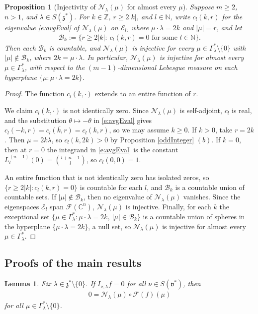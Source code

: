 \documentclass[11pt]{amsart}
\theoremstyle{plain}
\newtheorem{lemma}[theorem]{Lemma}
\newtheorem{proposition}[theorem]{Proposition}
\theoremstyle{definition}
\theoremstyle{remark}
\numberwithin{equation}{section}
\def\fz{\mathfrak{z}}
\def\fv{\mathfrak{v}}
\def\cB{\mathcal{B}}
\def\cE{\mathcal{E}}
\def\cN{\mathcal{N}}
\def\cF{\mathcal{F}}
\def\mz{\setminus\{0\}}
\def\C{{\mathbb C}}%
\def\N{{\mathbb N}}%
\def\Z{{\mathbb Z}}%
\numberwithin{equation}{section}
\begin{document}
\begin{proposition}[Injectivity of $\cN_\lambda(\mu)$ for almost every $\mu$]\label{p:aeInj}
	Suppose $m\geq 2$, $n>1$, and $\lambda\in S(\fz^*)$. For $k\in \Z$, $r\geq 2|k|$, and $l\in \N$, write $c_l(k, r)$ for the eigenvalue \eqref{e:avgEval} of $\cN_\lambda(\mu)$ on $\cE_l$, where $\mu\cdot\lambda=2k$ and $|\mu|=r$, and let
	\begin{align*}
		\cB_k:=\{r\geq 2|k|:\ c_l(k, r)=0 \text{ for some } l\in \N\}.
	\end{align*}
	Then each $\cB_k$ is countable, and $\cN_\lambda(\mu)$ is injective for every $\mu\in \Gamma_\lambda^*\mz$ with $|\mu|\notin \cB_{k}$, where $2k=\mu\cdot\lambda$. In particular, $\cN_\lambda(\mu)$ is injective for almost every $\mu\in \Gamma_\lambda^*$, with respect to the $(m-1)$-dimensional Lebesgue measure on each hyperplane $\{\mu: \mu\cdot\lambda=2k\}$.
\end{proposition}
\begin{proof}
	The function $c_l(k, \cdot)$ extends to an entire function of $r$.

	We claim $c_l(k, \cdot)$ is not identically zero. Since $\cN_\lambda(\mu)$ is self-adjoint, $c_l$ is real, and the substitution $\theta\mapsto-\theta$ in \eqref{e:avgEval} gives $c_l(-k, r)=\overline{c_l(k, r)}=c_l(k, r)$, so we may assume $k\geq0$. If $k>0$, take $r=2k$. Then $\mu=2k\lambda$, so $c_l(k, 2k)>0$ by Proposition \ref{oddInteger} $(b)$.
	If $k=0$, then at $r=0$ the integrand in \eqref{e:avgEval} is the constant $L_l^{(n-1)}(0)=\binom{l+n-1}{l}$, so $c_l(0, 0)=1$.

	An entire function that is not identically zero has isolated zeros, so $\{r\geq 2|k|: c_l(k, r)=0\}$ is countable for each $l$, and $\cB_k$ is a countable union of countable sets. If $|\mu|\notin \cB_k$, then no eigenvalue of $\cN_\lambda(\mu)$ vanishes. Since the eigenspaces $\cE_l$ span $\cF(\C^n)$, $\cN_\lambda(\mu)$ is injective. Finally, for each $k$ the exceptional set $\{\mu\in \Gamma_\lambda^*: \mu\cdot\lambda=2k,\ |\mu|\in \cB_k\}$ is a countable union of spheres in the hyperplane $\{\mu\cdot\lambda=2k\}$, a null set, so $\cN_\lambda(\mu)$  is injective for almost every $\mu\in \Gamma_\lambda^*$.
\end{proof}

\subsection{Proofs of the main results}

\begin{lemma}\label{zeroSlice}
	Fix $\lambda\in \fz^*\mz$. If $I_{\nu, \lambda}f=0$ for all $\nu\in S(\fv^*)$, then
	\begin{align*}
		0=\cN_\lambda(\mu)\circ\cF(f)(\mu)
	\end{align*}
for all $\mu\in \Gamma_\lambda^*\mz$. 
\end{lemma}
\end{document}
